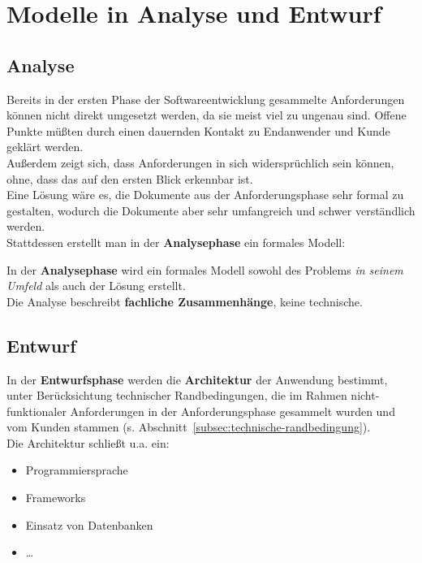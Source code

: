 \section{Modelle in Analyse und Entwurf}\label{sec:modelle-in-analyse-und-entwurf}

\subsection*{Analyse}



\noindent
Bereits in der ersten Phase der Softwareentwicklung gesammelte Anforderungen können nicht direkt umgesetzt werden, da sie meist viel zu ungenau sind.
Offene Punkte müßten durch einen dauernden Kontakt zu Endanwender und Kunde geklärt werden.\\
Außerdem zeigt sich, dass Anforderungen in sich widersprüchlich sein können, ohne, dass das auf den ersten Blick erkennbar ist.\\

\noindent
Eine Lösung wäre es, die Dokumente aus der Anforderungsphase sehr formal zu gestalten, wodurch die Dokumente aber sehr umfangreich und schwer verständlich werden.\\

\noindent
Stattdessen erstellt man in der \textbf{Analysephase} ein formales Modell:

\vspace{2mm}
\begin{tcolorbox}
    In der \textbf{Analysephase} wird ein formales Modell sowohl des Problems \textit{in seinem Umfeld} als auch der Lösung erstellt.\\
    Die Analyse beschreibt \textbf{fachliche Zusammenhänge}, keine technische.
\end{tcolorbox}
\vspace{2mm}


\subsection*{Entwurf}
In der \textbf{Entwurfsphase} werden die \textbf{Architektur} der Anwendung bestimmt, unter Berücksichtung technischer Randbedingungen, die im Rahmen nicht-funktionaler Anforderungen in der Anforderungsphase gesammelt wurden und vom Kunden stammen (s. Abschnitt~\ref{subsec:technische-randbedingung}).\\
Die Architektur schließt u.a. ein:

\begin{itemize}
    \item Programmiersprache
    \item Frameworks
    \item Einsatz von Datenbanken
    \item \ldots
\end{itemize}

